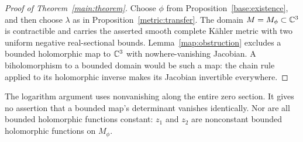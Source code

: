 \begin{proof}[Proof of Theorem~\ref{main:theorem}]
Choose $\phi$ from Proposition~\ref{base:existence}, and then choose
$\lambda$ as in Proposition~\ref{metric:transfer}.  The domain
$M=M_\phi\subset\mathbb C^3$ is contractible and carries the asserted smooth
complete K\"ahler metric with two uniform negative real-sectional
bounds.  Lemma~\ref{map:obstruction} excludes a bounded holomorphic
map to $\mathbb C^3$ with nowhere-vanishing Jacobian.  A biholomorphism to a
bounded domain would be such a map: the chain rule applied to its
holomorphic inverse makes its Jacobian invertible everywhere.
\end{proof}

The logarithm argument uses nonvanishing along the entire zero section.
It gives no assertion that a bounded map's determinant vanishes
identically.  Nor are all bounded holomorphic functions constant:
$z_1$ and $z_2$ are nonconstant bounded holomorphic functions on $M_\phi$.
